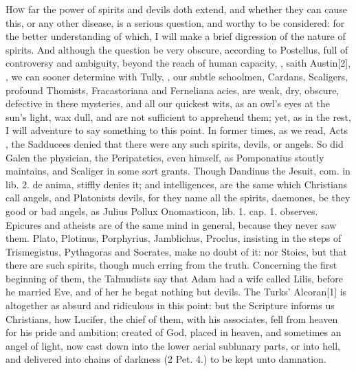 {{\lettrine{H}{ow} far the power of spirits and devils doth extend, and whether they
can cause this, or any other disease, is a serious question, and worthy
to be considered: for the better understanding of which, I will make a
brief digression of the nature of spirits. And although the question be
very obscure, according to Postellus, full of controversy and
ambiguity, beyond the reach of human capacity, , saith Austin[2\baselineskip], , we can sooner
determine with Tully, ,
our subtle schoolmen, Cardans, Scaligers, profound Thomists,
Fracastoriana and Ferneliana acies, are weak, dry, obscure, defective
in these mysteries, and all our quickest wits, as an owl's eyes at the
sun's light, wax dull, and are not sufficient to apprehend them; yet,
as in the rest, I will adventure to say something to this point. In
former times, as we read, Acts , the Sadducees denied that there
were any such spirits, devils, or angels. So did Galen the physician,
the Peripatetics, even \Aristotle himself, as Pomponatius stoutly
maintains, and Scaliger in some sort grants. Though Dandinus the
Jesuit, com. in lib. 2. de anima, stiffly denies it;  and intelligences, are the same which Christians call angels,
and Platonists devils, for they name all the spirits, daemones, be they
good or bad angels, as \textlatin{Julius Pollux Onomasticon}, lib. 1. cap. 1.
observes. Epicures and atheists are of the same mind in general,
because they never saw them. Plato, Plotinus, Porphyrius, Jamblichus,
Proclus, insisting in the steps of \textlatin{Trismegistus}, Pythagoras and
Socrates, make no doubt of it: nor Stoics, but that there are such
spirits, though much erring from the truth. Concerning the first
beginning of them, the Talmudists say that Adam had a wife called
Lilis, before he married Eve, and of her he begat nothing but devils.
The Turks' Alcoran[1\baselineskip] is altogether as absurd and ridiculous in this
point: but the Scripture informs us Christians, how Lucifer, the chief
of them, with his associates, fell from heaven for his pride and
ambition; created of God, placed in heaven, and sometimes an angel of
light, now cast down into the lower aerial sublunary parts, or into
hell, and delivered into chains of darkness (2 Pet.  4.) to be kept
unto damnation.

}}
